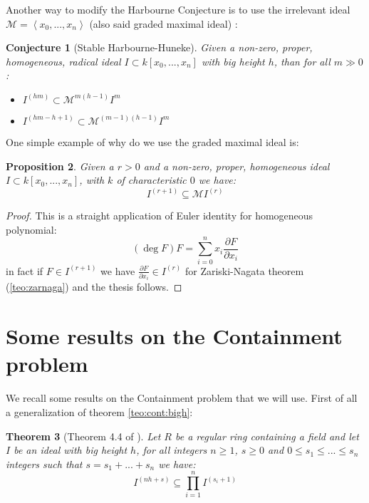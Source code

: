 \documentclass[notitlepage, a4]{book}
\theoremstyle{plain}
\newtheorem{teo}{Theorem}[section]
\newtheorem{prop}[teo]{Proposition}
\newtheorem{conj}[teo]{Conjecture}
\theoremstyle{remark}
\theoremstyle{definition}
\newcommand{\parder}[2]{ \frac{\partial #1}{\partial #2} }
\newcommand{\MM}{\mathcal{M}}
\begin{document}
	Another way to modify the Harbourne Conjecture is to use the irrelevant ideal $ \MM=\left\langle x_0 , ... ,x_n \right> $ (also said graded maximal ideal) : 
	
	\begin{conj}[Stable Harbourne-Huneke]\label{conj:stabharbhun}
	Given a non-zero, proper, homogeneous, radical ideal $ I \subset k[x_0 , ... , x_n] $ with big height $ h $, than for all $ m \gg 0 $:
	\begin{itemize}
	\item $ I^{(hm)} \subset \MM^{m(h-1)} I^m$
	\item $ I^{(hm - h +1 )} \subset \MM^{(m-1)(h-1)} I^m $
	\end{itemize}
	\end{conj}
	
	One simple example of why do we use the graded maximal ideal is:
	
	\begin{prop} \label{prop:eulid}
	Given a $ r>0 $ and a non-zero, proper, homogeneous ideal $ I \subset k[x_0 , ... , x_n] $, with $ k $ of characteristic $ 0 $ we have:
	\[ I^{(r+1)}   \subseteq \MM I^{(r)}\]
	\end{prop}
	\begin{proof}
	This is a straight application of Euler identity for homogeneous polynomial:
	\[ (\deg{F})F = \sum_{i=0}^{n} x_i \parder{F}{x_i} \]
	in fact if $ F \in I^{(r+1)} $ we have $ \parder{F}{x_i} \in I^{(r)} $ for Zariski-Nagata theorem (\ref{teo:zarnaga}) and the thesis follows.
 	\end{proof}
 	

\section{Some results on the Containment problem}

We recall some results on the Containment problem that we will use. First of all a generalization of theorem \ref{teo:cont:bigh}:

\begin{teo}[Theorem 4.4 of \cite{John14}]\label{teo:cont:bighgen}
Let $ R $ be a regular ring containing a field and let $ I $ be an ideal with big height $ h $, for all integers $ n \geq 1 $, $ s \geq 0 $ and $ 0 \leq s_1 \leq  ... \leq s_n $ integers such that $ s = s_1 +  ... + s_n $ we have:
\begin{equation}\label{eq:cont:bighgen}
	I^{(nh + s)} \subseteq \prod_{i=1}^{n} I^{(s_i + 1)}
\end{equation}
\end{teo}
\end{document}
